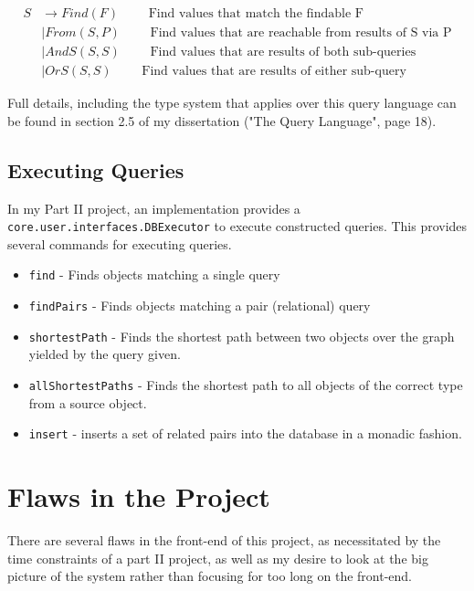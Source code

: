 \documentclass{report}
\newcommand \2[0]{\textbf{2}}
\newcommand \3[0]{\textbf{3}}
\begin{document}
    \begin{equation}\label{SingleQueries}
        \begin{split}
        S & \rightarrow Find(F) \quad\quad\text{ Find values that match the findable F}\\
        &\mid From(S, P) \quad\quad\text{ Find values that are reachable from results of S via P}\\
        &\mid AndS(S, S) \quad\quad\text{ Find values that are results of both sub-queries}\\
        &\mid OrS(S, S) \quad\quad\text{ Find values that are results of either sub-query}
        \end{split}
    \end{equation} 

Full details, including the type system that applies over this query language can be found in section 2.5 of my dissertation ("The Query Language", page 18).

\subsection{Executing Queries}\label{Commands}
In my Part II project, an implementation provides a \texttt{core.user.interfaces.DBExecutor} to execute constructed queries. This provides several commands for executing queries.

\begin{itemize}
    \item \texttt{find} - Finds objects matching a single query
    \item \texttt{findPairs} - Finds objects matching a pair (relational) query
    \item \texttt{shortestPath} - Finds the shortest path between two objects over the graph yielded by the query given.
    \item \texttt{allShortestPaths} - Finds the shortest path to all objects of the correct type from a source object.
    \item \texttt{insert} - inserts a set of related pairs into the database in a monadic fashion.
\end{itemize}



\section{Flaws in the Project}
There are several flaws in the front-end of this project, as necessitated by the time constraints of a part II project, as well as my desire to look at the big picture of the system rather than focusing for too long on the front-end.
\end{document}
